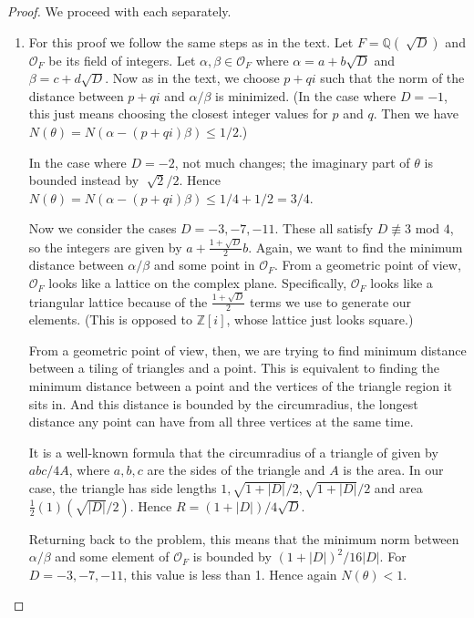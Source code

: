 \documentclass[12pt]{article}
\theoremstyle{remark}
\theoremstyle{named}
\renewcommand{\a}{\alpha}
\renewcommand{\b}{\beta}
\newcommand{\Z}{\mathbb Z}
\newcommand{\Q}{\mathbb Q}
\renewcommand{\mod}{\text{ mod }}
\newcommand{\abs}[1]{|#1|}
\begin{document}
\begin{proof}
    We proceed with each separately.
    \begin{enumerate}
        \item For this proof we follow the same steps as in the text. Let \(F = \Q(\sqrt[]{D})\) and \(\mathcal O_F\) be its field of integers. Let \(\a, \b \in \mathcal O_F\) where \(\a = a + b\sqrt D\) and \(\b = c + d \sqrt D\). Now as in the text, we choose \(p + qi\) such that the norm of the distance between \(p + qi\) and \(\a / \b\) is minimized. (In the case where \(D = -1\), this just means choosing the closest integer values for \(p\) and \(q\). Then we have \(N(\theta) = N(\a - (p + qi)\b) \le 1/2\).)
        
        In the case where \(D = -2\), not much changes; the imaginary part of \(\theta\) is bounded instead by \(\sqrt[]{2}/2\). Hence \(N(\theta) = N(\a - (p + qi)\b) \le 1/4 + 1/2 = 3/4\).

        Now we consider the cases \(D = -3, -7, -11\). These all satisfy \(D \not\equiv 3 \mod 4\), so the integers are given by \(a + \frac{1 + \sqrt{D}}{2}b\). Again, we want to find the minimum distance between \(\a/\b\) and some point in \(\mathcal O_F\). From a geometric point of view, \(\mathcal O_F\) looks like a lattice on the complex plane. Specifically, \(\mathcal O_F\) looks like a triangular lattice because of the \(\frac{1 + \sqrt{D}}{2}\) terms we use to generate our elements. (This is opposed to \(\Z[i]\), whose lattice just looks square.) 

        From a geometric point of view, then, we are trying to find minimum distance between a tiling of triangles and a point. This is equivalent to finding the minimum distance between a point and the vertices of the triangle region it sits in. And this distance is bounded by the circumradius, the longest distance any point can have from all three vertices at the same time. 

        It is a well-known formula that the circumradius of a triangle of given by \(abc / 4 A\), where \(a, b, c\) are the sides of the triangle and \(A\) is the area. In our case, the triangle has side lengths \(1, \sqrt{1 + \abs{D}} / 2, \sqrt{1 + \abs{D}} / 2\) and area \(\frac 1 2 (1)(\sqrt{\abs{D}} / 2)\). Hence \(R = (1 + \abs{D}) / 4 \sqrt{D}\).

        Returning back to the problem, this means that the minimum norm between \(\a/\b\) and some element of \(\mathcal O_F\) is bounded by \((1 + \abs{D})^2 / 16 \abs{D}\). For \(D = -3, -7, -11\), this value is less than 1. Hence again \(N(\theta) < 1\).


\end{enumerate}
\end{proof}
\end{document}
